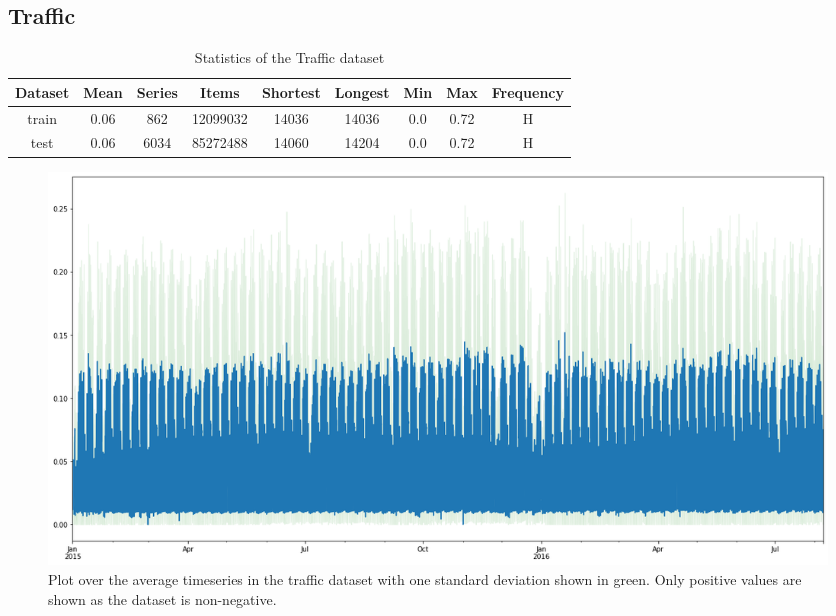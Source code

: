 \clearpage
\subsection{Traffic}

\begin{table}[htb]
    \begin{tabular}{||c | c c c c c c c c ||} 
        \hline
       Dataset & Mean & Series & Items & Shortest & Longest & Min & Max & Frequency\\ [0.5ex] 
        \hline\hline
        train & 0.06 & 862 & 12099032 & 14036 & 14036 & 0.0 & 0.72 & H\\ 
        \hline
        test & 0.06 & 6034 & 85272488 & 14060 & 14204 & 0.0 & 0.72 & H\\
        \hline
    \end{tabular}
   \caption{Statistics of the Traffic dataset}
\end{table}

\begin{figure}[htb]
    \centering
      \includegraphics[width=\linewidth]{4_designing/figures/traffic_plot.png}
      \caption{Plot over the average timeseries in the traffic dataset with one standard deviation shown in green. Only positive values are shown as the dataset is non-negative.}
      \label{fig:traffic_plot}
    \endminipage\hfill
\end{figure}

